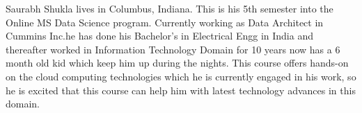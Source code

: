 Saurabh Shukla lives in Columbus, Indiana. This is his 5th semester into the Online MS Data Science program. 
Currently working as Data Architect in Cummins Inc.he has done his Bachelor's in Electrical Engg in India and 
thereafter worked in Information Technology Domain for 10 years now has a 6 month old kid which keep him up during the nights.
This course offers hands-on on the cloud computing technologies which he is currently engaged in his work,
so he is excited that this course can help him with latest technology advances in this domain.
